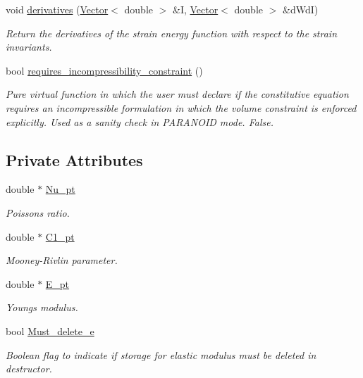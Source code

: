 \begin{DoxyCompactItemize}
void \hyperlink{classoomph_1_1GeneralisedMooneyRivlin_aa0ca6d085deb4758119ff68222a27a8b}{derivatives} (\hyperlink{classoomph_1_1Vector}{Vector}$<$ double $>$ \&I, \hyperlink{classoomph_1_1Vector}{Vector}$<$ double $>$ \&d\+WdI)
\begin{DoxyCompactList}\small\item\em Return the derivatives of the strain energy function with respect to the strain invariants. \end{DoxyCompactList}\item 
bool \hyperlink{classoomph_1_1GeneralisedMooneyRivlin_a2b41a132a90707ee2901787d398f45f8}{requires\+\_\+incompressibility\+\_\+constraint} ()
\begin{DoxyCompactList}\small\item\em Pure virtual function in which the user must declare if the constitutive equation requires an incompressible formulation in which the volume constraint is enforced explicitly. Used as a sanity check in P\+A\+R\+A\+N\+O\+ID mode. False. \end{DoxyCompactList}\end{DoxyCompactItemize}
\subsection*{Private Attributes}
\begin{DoxyCompactItemize}
\item 
double $\ast$ \hyperlink{classoomph_1_1GeneralisedMooneyRivlin_ae66d1130fccc98fc68d810f1f3e6b281}{Nu\+\_\+pt}
\begin{DoxyCompactList}\small\item\em Poisson\textquotesingle{}s ratio. \end{DoxyCompactList}\item 
double $\ast$ \hyperlink{classoomph_1_1GeneralisedMooneyRivlin_aebb4709747e2855ddaa8b455d50d0174}{C1\+\_\+pt}
\begin{DoxyCompactList}\small\item\em Mooney-\/\+Rivlin parameter. \end{DoxyCompactList}\item 
double $\ast$ \hyperlink{classoomph_1_1GeneralisedMooneyRivlin_a4844de8de168e51c24c5508ef195ae7a}{E\+\_\+pt}
\begin{DoxyCompactList}\small\item\em Young\textquotesingle{}s modulus. \end{DoxyCompactList}\item 
bool \hyperlink{classoomph_1_1GeneralisedMooneyRivlin_a38d89cd3412cac1adb945713168a5c86}{Must\+\_\+delete\+\_\+e}
\begin{DoxyCompactList}\small\item\em Boolean flag to indicate if storage for elastic modulus must be deleted in destructor. \end{DoxyCompactList}\end{DoxyCompactItemize}


